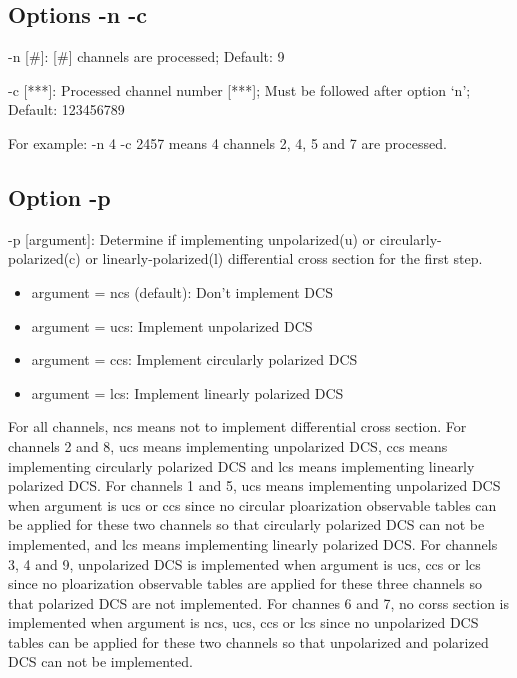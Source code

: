 \documentclass[a4paper]{article}
\begin{document}
\subsection{Options -n -c}
	-n [\#]: [\#] channels are processed; Default: 9

	-c [***]: Processed channel number [***]; Must be followed after option `n'; Default: 123456789

	For example: -n 4 -c 2457 means 4 channels 2, 4, 5 and 7 are processed.

\subsection{Option -p}
	-p [argument]: Determine if implementing unpolarized(u) or circularly-polarized(c) or linearly-polarized(l) differential cross section for the first step. 

         \begin{itemize}
	 \item argument = ncs (default): Don't implement DCS
	 \item argument = ucs: Implement unpolarized DCS
          \item argument = ccs: Implement circularly polarized DCS
          \item argument = lcs: Implement linearly polarized DCS
          \end{itemize}

For all channels, ncs means not to implement differential cross section. For channels 2 and 8, ucs means implementing unpolarized DCS, ccs means implementing circularly polarized DCS and lcs means implementing linearly polarized DCS. For channels 1 and 5, ucs means implementing unpolarized DCS when argument is ucs or ccs since no circular ploarization observable tables can be applied for these two channels so that circularly polarized DCS can not be implemented, and lcs means implementing linearly polarized DCS. For channels 3, 4 and 9, unpolarized DCS is implemented when argument is ucs, ccs or lcs since no ploarization observable tables are applied for these three channels so that polarized DCS are not implemented. For channes 6 and 7, no corss section is implemented when argument is ncs, ucs, ccs or lcs since no unpolarized DCS tables can be applied for these two channels so that unpolarized and polarized DCS can not be implemented.
\end{document}
